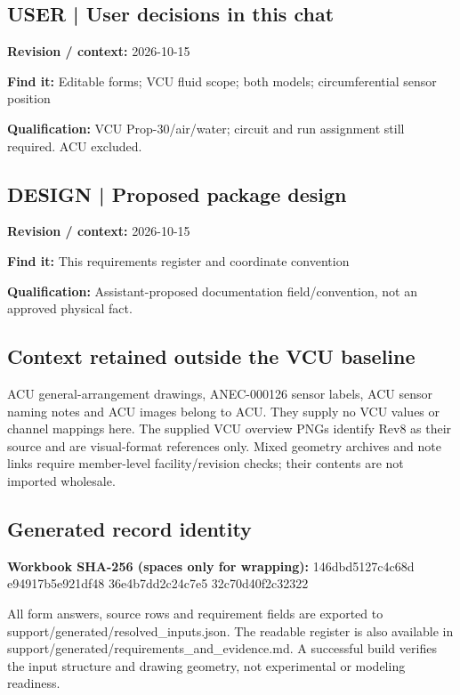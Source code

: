 \documentclass[11pt]{article}
\begin{document}
\par\noindent\begin{minipage}{\textwidth}\small
\subsection*{USER | User decisions in this chat}
\textbf{Revision / context:} 2026-10-15\par
\textbf{Find it:} Editable forms; VCU fluid scope; both models; circumferential sensor position\par
\textbf{Qualification:} VCU Prop-30/air/water; circuit and run assignment still required. ACU excluded.\par
\end{minipage}\par\vspace{5pt}
\par
\par\noindent\begin{minipage}{\textwidth}\small
\subsection*{DESIGN | Proposed package design}
\textbf{Revision / context:} 2026-10-15\par
\textbf{Find it:} This requirements register and coordinate convention\par
\textbf{Qualification:} Assistant-proposed documentation field/convention, not an approved physical fact.\par
\end{minipage}\par\vspace{5pt}
\subsection*{Context retained outside the VCU baseline}
ACU general-arrangement drawings, ANEC-000126 sensor labels, ACU sensor naming notes and ACU images belong to ACU. They supply no VCU values or channel mappings here. The supplied VCU overview PNGs identify Rev8 as their source and are visual-format references only. Mixed geometry archives and note links require member-level facility/revision checks; their contents are not imported wholesale.
\subsection*{Generated record identity}
\textbf{Workbook SHA-256 (spaces only for wrapping):} 146dbd5127c4c68d e94917b5e921df48 36e4b7dd2c24c7e5 32c70d40f2c32322\par
All form answers, source rows and requirement fields are exported to support/generated/resolved\_inputs.json. The readable register is also available in support/generated/requirements\_and\_evidence.md. A successful build verifies the input structure and drawing geometry, not experimental or modeling readiness.
\end{document}
